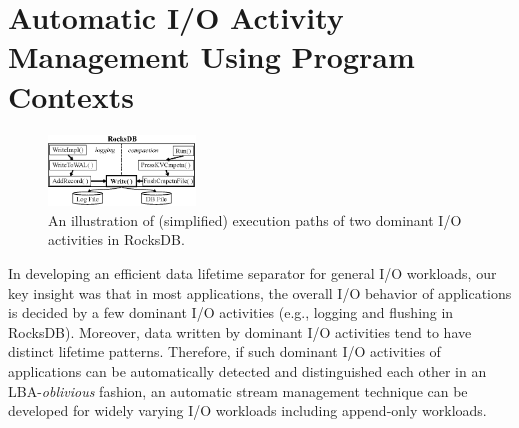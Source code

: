 \vspace{-10pt}
\section{Automatic I/O Activity Management Using Program Contexts}
\label{sec:programcontext}
\vspace{-5pt}
\begin{figure}[t]
	\centering
	\includegraphics[width=0.35\textwidth]{figure/writepath}
	\vspace{-10pt}
	\caption{An illustration of (simplified) execution paths of two dominant I/O activities in RocksDB.}
	\label{fig:iopath}
	\vspace{-20pt}
\end{figure}

In developing an efficient data lifetime separator for general I/O workloads,
our key insight was that in most applications,
the overall I/O behavior of 
applications is decided by a few dominant
I/O activities (e.g., logging and flushing in RocksDB). 
Moreover, 
data written by dominant I/O activities tend to have distinct lifetime patterns.
Therefore, if such dominant I/O activities of applications can be 
automatically detected and distinguished each other in an LBA-{\it oblivious} fashion, 
an automatic stream management technique can be developed for widely varying I/O workloads 
including append-only workloads.

